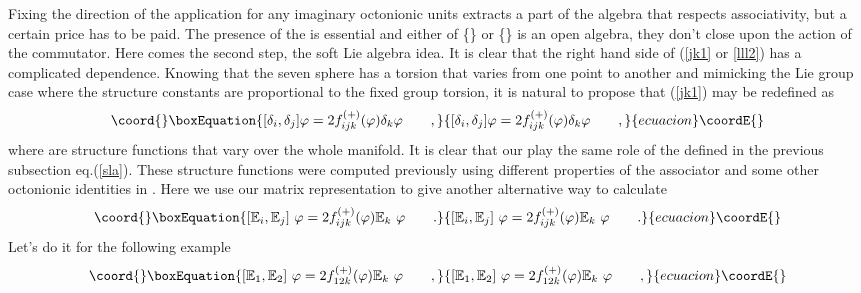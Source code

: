 \documentclass[a4paper,12pt]{book}
\begin{document}
Fixing the direction of the application for any imaginary octonionic units
extracts a part of the algebra that respects associativity, but a certain
price has to be paid. The presence of the \myHighlight{$\varphi $}\coordHE{} is essential and either
of \{\coordHE{}\} or \{\coordHE{}\} is an open algebra, they don't
close upon the action of the commutator. Here comes the second step, the
soft Lie algebra idea. It is clear that the right hand side of (\ref{jk1} or 
\ref{lll2}) has a complicated \myHighlight{$\varphi $}\coordHE{} dependence. Knowing that the seven
sphere has a torsion that varies from one point to another \cite{rom}\cite
{cart1}\cite{cart2} and mimicking the Lie group case where the structure
constants are proportional to the fixed group torsion, it is natural to
propose that (\ref{jk1}) may be redefined \cite{estps} as 
\begin{equation}\coord{}\boxEquation{
\lbrack \delta _{i},\delta _{j}]\varphi =2f_{ijk}^{\left( +\right) }(\varphi
)\delta _{k}\varphi \qquad ,
}{
\lbrack \delta _{i},\delta _{j}]\varphi =2f_{ijk}^{\left( +\right) }(\varphi
)\delta _{k}\varphi \qquad ,
}{ecuacion}\coordE{}\end{equation}
where \coordHE{} are structure functions that vary over the
whole \coordHE{}manifold. It is clear that our \coordHE{} play the same role
of the \coordHE{} defined in the previous subsection eq.(\ref{sla}).
These structure functions \coordHE{} were computed previously
using different properties of the associator and some other octonionic
identities in \cite{rom}\cite{estps}\cite{cart1}\cite{cart2}\cite{ced1}.
Here we use our matrix representation to give another alternative way to
calculate \coordHE{}%
\begin{equation}\coord{}\boxEquation{
\lbrack \Bbb{E}_{i},\Bbb{E}_{j}]{\ \varphi }=2f_{ijk}^{(+)}(\varphi )\Bbb{E}
_{k}{\ \varphi }\qquad .  \label{tor1}
}{
\lbrack \Bbb{E}_{i},\Bbb{E}_{j}]{\ \varphi }=2f_{ijk}^{(+)}(\varphi )\Bbb{E}
_{k}{\ \varphi }\qquad .  }{ecuacion}\coordE{}\end{equation}
Let's do it for the following example 
\begin{equation}\coord{}\boxEquation{
\lbrack \Bbb{E}_{1},\Bbb{E}_{2}]{\ \varphi }=2f_{12k}^{(+)}(\varphi )\Bbb{E}
_{k}{\ \varphi }\qquad ,
}{
\lbrack \Bbb{E}_{1},\Bbb{E}_{2}]{\ \varphi }=2f_{12k}^{(+)}(\varphi )\Bbb{E}
_{k}{\ \varphi }\qquad ,
}{ecuacion}\coordE{}\end{equation}
\end{document}
